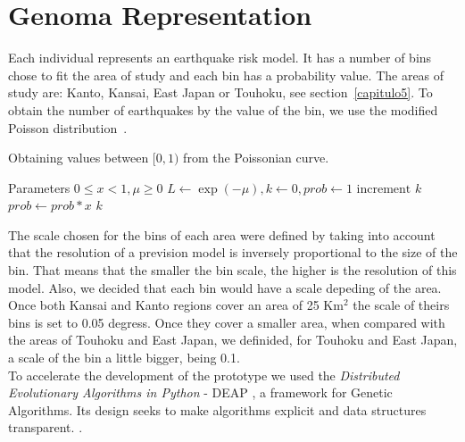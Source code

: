\section{Genoma Representation}
Each individual represents an earthquake risk model. It has a number of bins chose to fit the area of study and each bin has a probability value. The areas of study are: Kanto, Kansai, East Japan or Touhoku, see section~\ref{capitulo5}. To obtain the number of earthquakes by the value of the bin, we use the modified Poisson distribution~\cite{NumericalRecipes}.   
	
\begin{algorithm}
  \caption{Obtaining values between $[0,1)$ from the Poissonian curve.}
  \label{InversePoisson}
  \begin{algorithmic}
    \STATE Parameters $0 \leq x < 1, \mu \geq 0$
    \STATE $L \gets \exp{(-\mu)}, k \gets 0, prob \gets 1$
    \REPEAT 
    \STATE $\text{increment }k$
    \STATE $prob \gets prob*x$
    \RETURN $k$
  \end{algorithmic}
\end{algorithm}	

The scale chosen for the bins of each area were defined by taking into account that the resolution of a prevision model is inversely proportional to the size of the bin. That means that the smaller the bin scale, the higher is the resolution of this model. Also, we decided that each bin would have a scale depeding of the area. Once both Kansai and Kanto regions cover an area of 25 Km$^2$ the scale of theirs bins is set to 0.05 degress. Once they cover a smaller area, when compared with the areas of Touhoku and East Japan, we definided, for Touhoku and East Japan, a scale of the bin a little bigger, being 0.1.\\

To accelerate the development of the prototype we used the {\it Distributed Evolutionary Algorithms in Python} - DEAP \cite{DeRainville:2012:DPF:2330784.2330799}, a framework for Genetic Algorithms.
Its design seeks to make algorithms explicit and data structures transparent. \cite{DeRainville:2012:DPF:2330784.2330799}.\\


